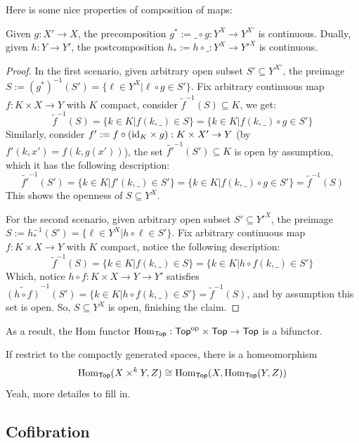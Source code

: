 \documentclass{article}
\begin{document}
Here is some nice properties of composition of maps:
\begin{prop}
    Given $g:X'\rightarrow X$, the precomposition $g^*:=\_\circ g:Y^X\rightarrow Y^{X'}$ is continuous. Dually, given $h:Y\rightarrow Y'$, the postcomposition $h_*:=h\circ\_:Y^X\rightarrow Y'^X$ is continuous.
\end{prop}
\begin{proof}
    In the first scenario, given arbitrary open subset $S'\subseteq Y^{X'}$, the preimage $S:=(g^*)^{-1}(S') = \{\ell\in Y^X|\ell\circ g\in S'\}$. Fix arbitrary continuous map $f:K\times X\rightarrow Y$ with $K$ compact, consider $\tilde{f}^{-1}(S)\subseteq K$, we get:
    \[\tilde{f}^{-1}(S) = \{k\in K|f(k,\_)\in S\} = \{k\in K|f(k,\_)\circ g\in S'\}\]
    Similarly, consider $f' := f\circ (\mathrm{id}_K\times g):K\times X'\rightarrow Y$ (by $f'(k,x') = f(k,g(x'))$), the set $\tilde{f'}^{-1}(S')\subseteq K$ is open by assumption, which it has the following description:
    \[\tilde{f'}^{-1}(S')=\{k\in K|f'(k,\_)\in S'\} = \{k\in K|f(k,\_)\circ g\in S'\} = \tilde{f}^{-1}(S)\] 
    This shows the openness of $S\subseteq Y^X$.

    \hfil

    For the second scenario, given arbitrary open subset $S'\subseteq Y'^X$, the preimage $S:= h_*^{-1}(S') = \{\ell\in Y^X|h\circ \ell\in S'\}$. Fix arbitrary continuous map $f:K\times X\rightarrow Y$ with $K$ compact, notice the following description:
    \[\tilde{f}^{-1}(S) = \{k\in K|f(k,\_)\in S\} = \{k\in K|h\circ f(k,\_)\in S'\}\]
    Which, notice $h\circ f:K\times X\rightarrow Y\rightarrow Y'$ satisfies $\tilde{(h\circ f)}^{-1}(S') = \{k\in K|h\circ f(k,\_)\in S'\} = \tilde{f}^{-1}(S)$, and by assumption this set is open. So, $S\subseteq Y^X$ is open, finishing the claim.
\end{proof}

As a result, the Hom functor $\mathrm{Hom}_{\mathsf{Top}}:\mathsf{Top}^{\mathrm{op}} \times \mathsf{Top}\rightarrow \mathsf{Top}$ is a bifunctor.

\hfil

If restrict to the compactly generated spaces, there is a homeomorphism \[\mathrm{Hom}_{\mathsf{Top}} (X\times^k Y, Z)\cong \mathrm{Hom}_{\mathsf{Top}} (X, \mathrm{Hom}_{\mathsf{Top}} (Y,Z))\]
Yeah, more detailes to fill in.

\newpage

\subsection{Cofibration}
\end{document}
